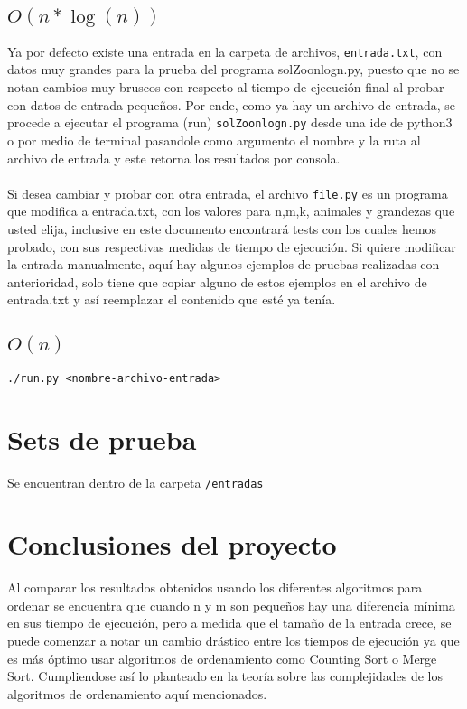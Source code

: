 \documentclass{article}
\begin{document}
		\subsection{$O(n*\log(n))$}		
		Ya por defecto existe una entrada en la carpeta de archivos, \texttt{entrada.txt}, con datos muy grandes para la prueba del programa solZoonlogn.py, puesto que no se notan cambios muy bruscos con respecto al tiempo de ejecución final al probar con datos de entrada pequeños. 
		Por ende, como ya hay un archivo de entrada, se procede a ejecutar el programa (run) \texttt{solZoonlogn.py} desde una ide de python3 o por medio de terminal pasandole como argumento el nombre y la ruta al archivo de entrada y este retorna los resultados por consola.\\\\
		Si desea cambiar y probar con otra entrada, el archivo \texttt{file.py} es un programa que modifica a entrada.txt, con los valores para n,m,k, animales y grandezas que usted elija, inclusive en este documento encontrará tests con los cuales hemos probado, con sus respectivas medidas de tiempo de ejecución. Si quiere modificar la entrada manualmente, aquí hay algunos ejemplos de pruebas realizadas con anterioridad, solo tiene que copiar alguno de estos ejemplos en el archivo de entrada.txt y así reemplazar el contenido que esté ya tenía.
		\subsection{$O(n)$}
			\texttt{./run.py <nombre-archivo-entrada>}
	\section{Sets de prueba}
		Se encuentran dentro de la carpeta \texttt{/entradas}
	\section{Conclusiones del proyecto}
Al comparar los resultados obtenidos usando los diferentes algoritmos para ordenar se encuentra que cuando n y m son pequeños hay una diferencia mínima en sus tiempo de ejecución, pero a medida que el tamaño de la entrada crece, se puede comenzar a notar un cambio drástico entre los tiempos de ejecución ya que es más óptimo usar algoritmos de ordenamiento como Counting Sort o Merge Sort.
Cumpliendose así lo planteado en la teoría sobre las complejidades de los algoritmos de ordenamiento aquí mencionados.
\end{document}
